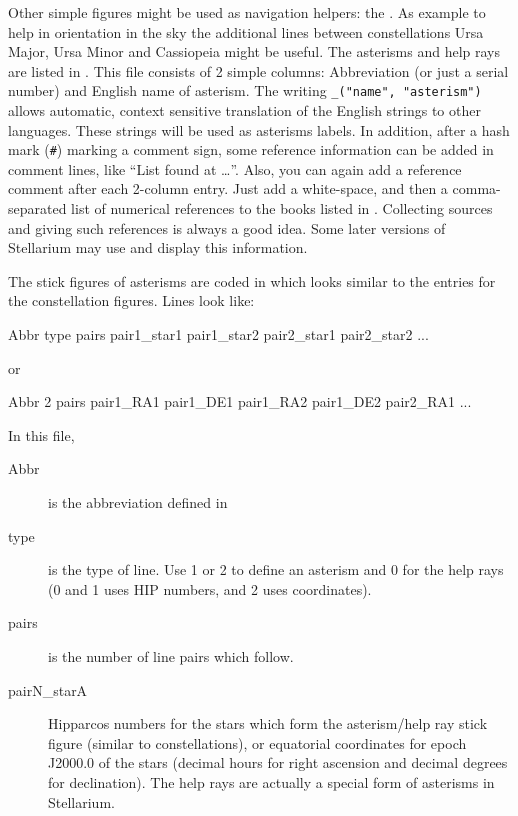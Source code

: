 Other simple figures might be used as navigation helpers: the . 
As example to help in orientation in the sky the additional lines between constellations 
Ursa Major, Ursa Minor and Cassiopeia might be useful. The asterisms and help rays are listed in
. This file consists of 2 simple columns:
Abbreviation (or just a serial number) and English
name of asterism. The writing \texttt{\_("name", "asterism")} allows automatic, context sensitive
translation of the English strings to other languages. These strings
will be used as asterisms labels. In addition, after a hash mark (\texttt{\#}) marking a comment sign, 
some reference information can be added in comment lines, like ``List found at \ldots''.
Also, you can  again add a reference comment after each
2-column entry. Just add a white-space, and then a comma-separated list
of numerical references to the books listed in .
Collecting sources and giving such references 
is always a good idea. Some later versions of Stellarium may use and display this information.

The stick figures of asterisms are coded in 
which looks similar to the entries for the constellation
figures. Lines look like:

\begin{configfile}[\scriptsize]
Abbr type pairs pair1_star1 pair1_star2 pair2_star1 pair2_star2 ...
\end{configfile}
or
\begin{configfile}[\scriptsize]
Abbr 2 pairs pair1_RA1 pair1_DE1 pair1_RA2 pair1_DE2 pair2_RA1 ...
\end{configfile}
In this file,
\begin{description}
\item[Abbr] is the abbreviation defined in 
\item[type] is the type of line. Use 1 or 2 to define an asterism and 0 for the help rays (0 and 1 uses HIP numbers, and 2 uses coordinates).
\item[pairs] is the number of line pairs which follow.
\item[pairN\_starA] Hipparcos numbers for the stars which form the asterism/help ray stick figure (similar to constellations),
  or equatorial coordinates for epoch J2000.0 of the stars (decimal hours for right ascension and decimal degrees for declination).
  The help rays are actually a special form of asterisms in Stellarium. 
\end{description}

